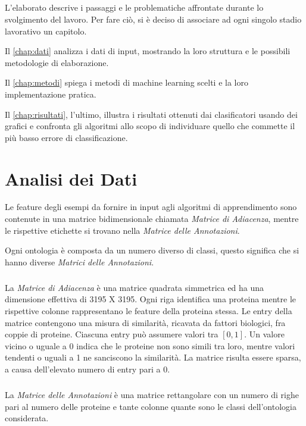 \documentclass[12pt,a4paper,oneside,hidelinks]{report}
\begin{document}
\paragraph*{}
L'elaborato descrive i passaggi e le problematiche affrontate durante lo svolgimento del lavoro. Per fare ciò, si è deciso di associare ad ogni singolo stadio lavorativo un capitolo. 

Il \autoref{chap:dati} analizza i dati di input, mostrando la loro struttura e le possibili metodologie di elaborazione. 

Il \autoref{chap:metodi} spiega i metodi di machine learning scelti e la loro implementazione pratica. 

Il \autoref{chap:risultati}, l'ultimo, illustra i risultati ottenuti dai clasificatori usando dei grafici e confronta gli algoritmi allo scopo di individuare quello che commette il più basso errore di classificazione.

\chapter{Analisi dei Dati} 
\label{chap:dati}
Le feature degli esempi da fornire in input agli algoritmi di apprendimento sono contenute in una matrice bidimensionale chiamata \textit{Matrice di Adiacenza}, mentre le rispettive etichette si trovano nella \textit{Matrice delle Annotazioni}.

Ogni ontologia è composta da un numero diverso di classi, questo significa che si hanno diverse \textit{Matrici delle Annotazioni}.

\paragraph*{}
La \textit{Matrice di Adiacenza} è una matrice quadrata simmetrica ed ha una dimensione effettiva di 3195 X 3195. Ogni riga identifica una proteina mentre le rispettive colonne rappresentano le feature della proteina stessa. Le entry della matrice contengono una misura di similarità, ricavata da fattori biologici, fra coppie di proteine.
Ciascuna entry può assumere valori tra $[0,1]$. Un valore vicino o uguale a 0 indica che le proteine non sono simili tra loro, mentre valori tendenti o uguali a 1 ne sanciscono la similarità. 
La matrice risulta essere sparsa, a causa dell'elevato numero di entry pari a 0.

\paragraph*{}
La \textit{Matrice delle Annotazioni} è una matrice rettangolare con un numero di righe pari al numero delle proteine e tante colonne quante sono le classi dell'ontologia considerata.
\end{document}

